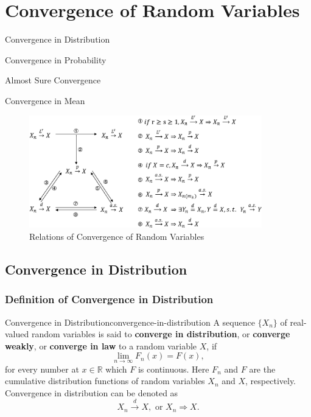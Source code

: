 \chapter{Convergence of Random Variables}

\begin{introduction}
    \item Convergence in Distribution
    \item Convergence in Probability
    \item Almost Sure Convergence
    \item Convergence in Mean
\end{introduction}

\begin{figure}[htp]
    \centering
    \includegraphics[width=0.9\textwidth]{figures/relation-of-convergences.eps}
    \caption{Relations of Convergence of Random Variables}
\end{figure}

\section{Convergence in Distribution}

\subsection{Definition of Convergence in Distribution}

\begin{definition}{Convergence in Distribution}{convergence-in-distribution}
    A sequence $\{X_n\}$ of real-valued random variables is said to \textbf{converge in distribution}, or \textbf{converge weakly}, or \textbf{converge in law} to a random variable $X$, if
    \begin{equation}
        \lim_{n\to\infty}F_n(x)=F(x),
    \end{equation}
    for every number at $x\in\mathbb{R}$ which $F$ is continuous. Here $F_n$ and $F$ are the cumulative distribution functions of random variables $X_n$ and $X$, respectively. Convergence in distribution can be denoted as
    \begin{equation}
        X_n \stackrel{d}{\rightarrow} X, \text{ or } X_n \Rightarrow X.
    \end{equation}
\end{definition}

